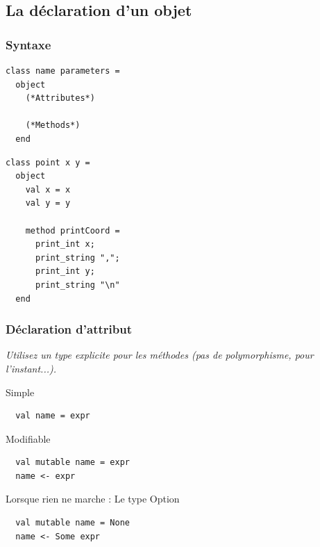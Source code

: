 \subsection{La déclaration d'un objet} %
\begin{frame}[fragile]
	\frametitle{Syntaxe}
	\begin{minipage}{0.45\textwidth}
		\lstset{basicstyle=\small}
		\begin{lstlisting}
class name parameters =
  object
    (*Attributes*)

    (*Methods*)
  end
		\end{lstlisting}
	\end{minipage}
	\begin{minipage}{0.4\textwidth}
		\begin{lstlisting}
class point x y =
  object
    val x = x
    val y = y

    method printCoord =
      print_int x;
      print_string ",";
      print_int y;
      print_string "\n"
  end
		\end{lstlisting}
	\end{minipage}
\end{frame}

\begin{frame}[fragile]
	\frametitle{Déclaration d'attribut}
	\textit{Utilisez un type explicite pour les méthodes (pas de polymorphisme, pour l'instant...).}\\
	\begin{block}{Simple}
		\begin{lstlisting}
  val name = expr
		\end{lstlisting}
	\end{block}
	\begin{block}{Modifiable}
		\begin{lstlisting}
  val mutable name = expr
  name <- expr
		\end{lstlisting}
	\end{block}
	\begin{block}{Lorsque rien ne marche : Le type Option}
		\begin{lstlisting}
  val mutable name = None
  name <- Some expr
		\end{lstlisting}
	\end{block}
\end{frame}

